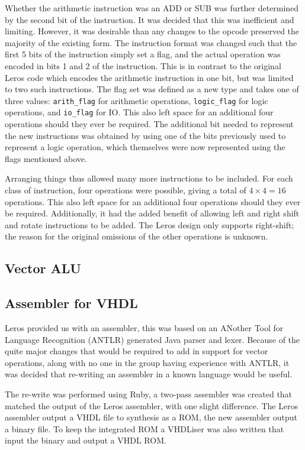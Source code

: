 Whether the arithmetic instruction was an ADD or SUB was further determined by
the second bit of the instruction. It was decided that this was inefficient and
limiting. However, it was desirable than any changes to the opcode preserved the
majority of the existing form. The instruction format was changed such that the
first 5 bits of the instruction simply set a flag, and the actual operation was
encoded in bits 1 and 2 of the instruction. This is in contrast to the original
Leros code which encodes the arithmetic instruction in one bit, but was limited
to two such instructions. The flag set was defined as a new type and takes one
of three values: \texttt{arith\_flag} for arithmetic operations,
\texttt{logic\_flag} for logic operations, and  \texttt{io\_flag} for IO. This
also left space for an additional four operations should they ever be required.
The additional bit needed to represent the new instructions was obtained by
using one of the bits previously used to represent a logic operation, which
themselves were now represented using the flags mentioned above.

Arranging things thus allowed many more instructions to be included. For each
class of instruction, four operations were possible, giving a total of $4 \times
4 = 16$ operations. This also left space for an additional four operations
should they ever be required. Additionally, it  had the added benefit of
allowing left and right shift and rotate instructions to be added. The Leros
design only supports right-shift; the reason for the original omissions of the other
operations is unknown.



\subsection{Vector ALU}


\subsection{Assembler for VHDL}

  Leros provided us with an assembler, this was based on an ANother Tool for
  Language Recognition (ANTLR) generated Java parser and lexer.  Because of the
  quite major changes that would be required to add in support for vector
  operations, along with no one in the group having experience with ANTLR, it
  was decided that re-writing an assembler in a known language would be useful.

  The re-write was performed using Ruby, a two-pass assembler was created that
  matched the output of the Leros assembler, with one slight difference.  The
  Leros assembler output a VHDL file to synthesis as a ROM, the new assembler
  output a binary file.  To keep the integrated ROM a VHDLiser was also written
  that input the binary and output a VHDL ROM.
